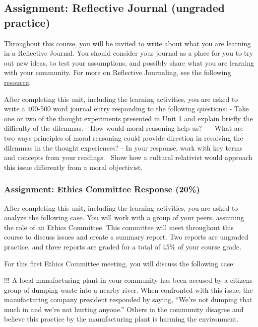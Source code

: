 \documentclass[
]{book}
\begin{document}
\hypertarget{assignment-reflective-journal-ungraded-practice-1}{%
\subsection{Assignment: Reflective Journal (ungraded practice)}\label{assignment-reflective-journal-ungraded-practice-1}}

Throughout this course, you will be invited to write about what you are learning
in a Reflective Journal. You should consider your journal as a place for you to
try out new ideas, to test your assumptions, and possibly share what you are
learning with your community. For more on Reflective Journaling, see the
following \href{Reflective_Journaling.pdf}{resource}.

After completing this unit, including the learning activities, you are asked to
write a 400-500 word journal entry responding to the following questions:
- Take one or two of the thought experiments presented in Unit 1 and explain
briefly the difficulty of the dilemmas.
- How would moral reasoning help us? ~
- What are two ways principles of moral reasoning could provide direction in
resolving the dilemmas in the thought experiences?
- In your response, work with key terms and concepts from your readings. ~Show
how a cultural relativist would approach this issue differently from a moral
objectivist.

\hypertarget{assignment-ethics-committee-response-20-1}{%
\subsubsection{Assignment: Ethics Committee Response (20\%)}\label{assignment-ethics-committee-response-20-1}}

After completing this unit, including the learning activities, you are asked to
analyze the following case. You will work with a group of your peers, assuming the role of an Ethics
Committee. This committee will meet throughout this course to
discuss issues and create a summary report. Two reports are ungraded practice, and three reports are graded for a total of 45\% of your course grade.

For this first Ethics Committee meeting, you will discuss the following case:

!!! A local manufacturing plant in your community has been accused by a citizens group of dumping waste into a nearby river. When confronted with this issue, the manufacturing company president responded by saying, ``We're not dumping that much in and we're not hurting anyone.'' Others in the community disagree and believe this practice by the manufacturing plant is harming the environment.
\end{document}
